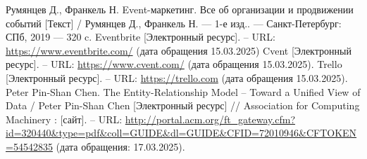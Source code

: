 \begin{thebibliography}{}
	 Румянцев Д., Франкель Н. Event-маркетинг. Все об организации и продвижении событий [Текст] / Румянцев Д., Франкель Н. — 1-е изд.. — Санкт-Петербург: СПб, 2019 — 320 c.
	 Eventbrite [Электронный ресурс]. -- URL:  \url{https://www.eventbrite.com/} (дата обращения 15.03.2025)
	 Cvent [Электронный ресурс]. -- URL: \url{https://www.cvent.com/} (дата обращения 15.03.2025).
	 Trello [Электронный ресурс]. -- URL: \url{https://trello.com} (дата обращения 15.03.2025).
	 Peter Pin-Shan Chen. The Entity-Relationship Model -- Toward a Unified View of Data / Peter Pin-Shan Chen [Электронный ресурс] // Association for Computing Machinery : [сайт]. -- URL: \url{http://portal.acm.org/ft_gateway.cfm?id=320440&type=pdf&coll=GUIDE&dl=GUIDE&CFID=72010946&CFTOKEN=54542835} (дата обращения: 17.03.2025).
\end{thebibliography}
